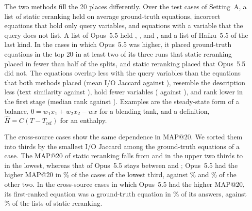 The two methods fill the 20 places differently. Over the test cases of Setting~A, a list of static
reranking held on average \CompCorrectAProp{} ground-truth equations, \CompCoveredAProp{} incorrect
equations that hold only query variables, and \CompOutsideAProp{} equations with a variable that
the query does not list. A list of Opus~5.5 held \CompCorrectAOpus, \CompCoveredAOpus, and
\CompOutsideAOpus, and a list of Haiku~5.5 \CompOutsideAHaiku{} of the last kind.
In the \NOpusWinRec{} cases in
which Opus~5.5 was higher, it placed \NOnlyOpusEq{} ground-truth equations in the top 20 in at
least two of its three runs that static reranking placed in fewer than half of the splits, and
static reranking placed \NOnlyPropEq{} that Opus~5.5 did not. The \NOnlyOpusEq{} equations overlap
less with the query variables than the \NBothEq{} equations that both methods placed (mean I/O
Jaccard \JacOnlyOpus{} against \JacBoth),
resemble the description less (text similarity \TextOnlyOpus{} against \TextBoth), hold fewer
variables (\VarsOnlyOpus{} against \VarsBoth), and rank lower in the first stage (median rank
\RankOnlyOpus{} against \RankBoth). Examples are the steady-state form of a balance,
$0 = w_1 x_1 + w_2 x_2 - w x$ for a blending tank, and a definition,
$\hat{H} = C (T - T_{\mathrm{ref}})$ for an enthalpy.

The cross-source cases show the same dependence in MAP@20. We sorted them into thirds by the
smallest I/O Jaccard among the ground-truth equations of a case. The MAP@20 of static reranking
falls from \TerHighProp{} and \TerMidProp{} in the upper two thirds to \TerLowProp{} in the lowest,
whereas that of Opus~5.5 stays between \TerOpusMin{} and \TerOpusMax; Opus~5.5 had the higher
MAP@20 in \TerLowWin\% of the cases of the lowest third, against \TerMidWin\% and \TerHighWin\% of
the other two. In the cross-source cases in which Opus~5.5 had the higher MAP@20, its first-ranked
equation was a ground-truth equation in \RankOneCrossOpus\% of its answers, against
\RankOneCrossProp\% of the lists of static reranking.
